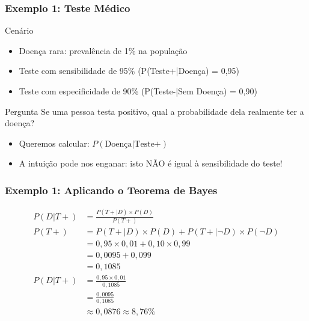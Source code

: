 \documentclass[11pt]{beamer}
\begin{document}
\begin{frame}
\frametitle{Exemplo 1: Teste Médico}
\begin{block}{Cenário}
\begin{itemize}
\item Doença rara: prevalência de 1\% na população
\item Teste com sensibilidade de 95\% (P(Teste+|Doença) = 0,95)
\item Teste com especificidade de 90\% (P(Teste-|Sem Doença) = 0,90)
\end{itemize}
\end{block}

\begin{alertblock}{Pergunta}
Se uma pessoa testa positivo, qual a probabilidade dela realmente ter a doença?
\end{alertblock}

\begin{itemize}
\item Queremos calcular: $P(\text{Doença}|\text{Teste+})$
\item A intuição pode nos enganar: isto NÃO é igual à sensibilidade do teste!
\end{itemize}
\end{frame}

\begin{frame}
\frametitle{Exemplo 1: Aplicando o Teorema de Bayes}
\begin{align*}
P(D|T+) &= \frac{P(T+|D) \times P(D)}{P(T+)} \\[10pt]
P(T+) &= P(T+|D) \times P(D) + P(T+|\neg D) \times P(\neg D) \\
&= 0,95 \times 0,01 + 0,10 \times 0,99 \\
&= 0,0095 + 0,099 \\
&= 0,1085 \\[10pt]
P(D|T+) &= \frac{0,95 \times 0,01}{0,1085} \\
&= \frac{0,0095}{0,1085} \\
&\approx 0,0876 \approx 8,76\%
\end{align*}
\end{frame}
\end{document}
